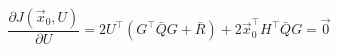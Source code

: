\documentclass{article}
\begin{document}
\thispagestyle{empty}
$$
\frac{\partial J(\vec{x}_0,U)}{\partial U} = 2 U^\top(G^\top\bar{Q}G + \bar{R}) + 2 \vec{x}_0^\top H^\top \bar{Q} G = \vec{0}
$$
\end{document}
